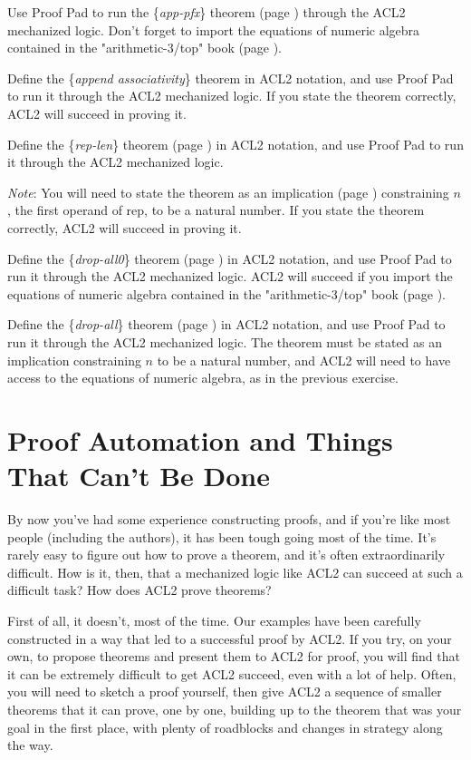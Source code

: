 \begin{ExerciseList}
\Exercise Use Proof Pad to run the \{\emph{app-pfx}\} theorem
(page \pageref{app-pfx-thm}) through the ACL2 mechanized logic.
Don't forget to import the equations of numeric algebra
contained in the "arithmetic-3/top" book (page \pageref{arith-top-book}).

\Exercise Define the \{\emph{append associativity}\} theorem in ACL2 notation,
and use Proof Pad to run it through the ACL2 mechanized logic.
If you state the theorem correctly, ACL2 will succeed in proving it.

\Exercise Define the \{\emph{rep-len}\} theorem (page \pageref{rep-len}) in ACL2 notation,
and use Proof Pad to run it through the ACL2 mechanized logic.

\emph{Note}: You will need to state the theorem as an implication (page \pageref{implies-def})
constraining $n$, the first operand of rep, to be a natural number.
If you state the theorem correctly, ACL2 will succeed in proving it.

\Exercise Define the \{\emph{drop-all0}\} theorem (page \pageref{drop-all0}) in ACL2 notation,
and use Proof Pad to run it through the ACL2 mechanized logic.
ACL2 will succeed if you import the equations of numeric algebra
contained in the "arithmetic-3/top" book (page \pageref{arith-top-book}).

\Exercise Define the \{\emph{drop-all}\} theorem (page \pageref{drop-all}) in ACL2 notation,
and use Proof Pad to run it through the ACL2 mechanized logic.
The theorem must be stated as an implication constraining $n$ to be a natural number,
and ACL2 will need to have access to the equations of numeric algebra,
as in the previous exercise.

\end{ExerciseList}

\section{Proof Automation and Things That Can't Be Done}
\label{sec:halting-problem}

By now you've had some experience constructing proofs, and if you're like most people
(including the authors), it has been tough going most of the time.
It's rarely easy to figure out how to prove a theorem,
and it's often extraordinarily difficult.
How is it, then, that a mechanized logic like ACL2 can succeed at such a difficult task?
How does ACL2 prove theorems?

First of all, it doesn't, most of the time.
Our examples have been carefully constructed in a way that
led to a successful proof by ACL2.
If you try, on your own, to propose theorems
and present them to ACL2 for proof, you will find that it can be
extremely difficult to get ACL2 succeed, even with a lot of help.
Often, you will need to sketch a proof yourself,
then give ACL2 a sequence of smaller theorems
that it can prove, one by one, building up to
the theorem that was your goal in the first place,
with plenty of roadblocks and changes in strategy along the way.

